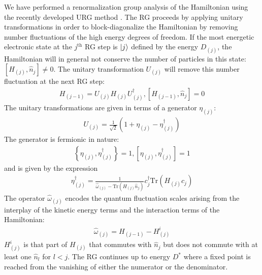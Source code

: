 \documentclass[reprint,prb,superscriptaddress]{revtex4-2}
\begin{document}
We have performed a renormalization group analysis of the Hamiltonian using the recently developed URG method \cite{anirbanmott2,anirbanmott2,anirbanurg1,anirbanurg2,siddharthacpi,santanukagome,1dhubjhep}. The RG proceeds by applying unitary transformations in order to block-diagonalize the Hamiltonian by removing number fluctuations of the high energy degrees of freedom. If the most energetic electronic state at the \(j^\text{th}\) RG step is \(\ket{j}\) defined by the energy \(D_{(j)}\), the Hamiltonian will in general not conserve the number of particles in this state: \(\left[H_{(j)}, \hat n_{j}\right] \neq 0\). The unitary transformation \(U_{(j)}\) will remove this number fluctuation at the next RG step:
\begin{equation}\begin{aligned}
	H_{(j-1)} = U_{(j)} H_{(j)} U^\dagger_{(j)}, \left[H_{(j-1)}, \hat n_{j}\right] =0
\end{aligned}\end{equation}
The unitary transformations are given in terms of a generator \(\eta_{(j)}\):
\begin{equation}\begin{aligned}
	U_{(j)} = \frac{1}{\sqrt 2}\left(1 + \eta_{(j)} - \eta_{(j)}^\dagger\right) 
\end{aligned}\end{equation}
The generator is fermionic in nature:
\begin{equation}\begin{aligned}
	\left\{ \eta_{(j)},\eta_{(j)}^\dagger \right\} = 1, \left[ \eta_{(j)},\eta_{(j)}^\dagger \right] = 1
\end{aligned}\end{equation}
and is given by the expression
\begin{equation}\begin{aligned}
	\eta^\dagger_{(j)} = \frac{1}{\hat \omega_{(j)} - \text{Tr}\left(H_{(j)} \hat n_{j}\right) } c^\dagger_{j} \text{Tr}\left(H_{(j)}c_{j}\right)
\end{aligned}\end{equation}
The operator \(\hat \omega_{(j)}\) encodes the quantum fluctuation scales arising from the interplay of the kinetic energy terms and the interaction terms of the Hamiltonian:
\begin{equation}\begin{aligned}
	\hat \omega_{(j)} = H_{(j-1)} - H^i_{(j)}
\end{aligned}\end{equation}
\(H^i_{(j)}\) is that part of \(H_{(j)}\) that commutes with \(\hat n_j\) but does not commute with at least one \(\hat n_l\) for \(l < j\). The RG continues up to energy \(D^*\) where a fixed point is reached from the vanishing of either the numerator or the denominator.
\end{document}
